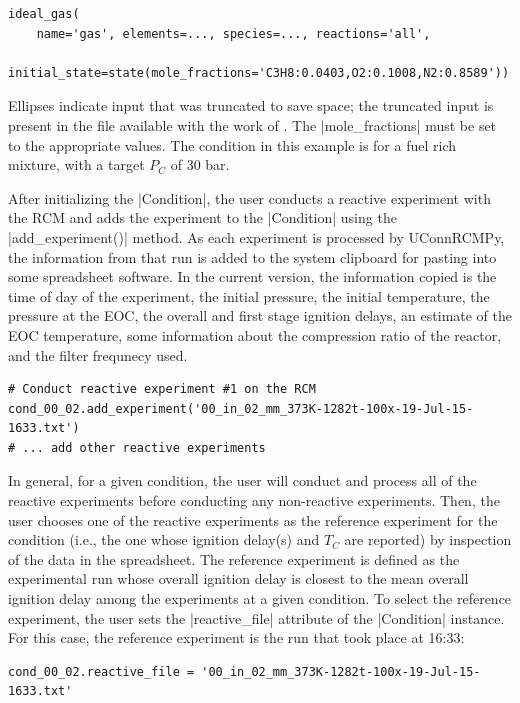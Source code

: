 \documentclass[12pt]{../ussci}
\begin{document}
\begin{verbatim}
ideal_gas(
    name='gas', elements=..., species=..., reactions='all',
    initial_state=state(mole_fractions='C3H8:0.0403,O2:0.1008,N2:0.8589'))
\end{verbatim}

Ellipses indicate input that was truncated to save space; the truncated input is
present in the file available with the work of \textcite{Dames2016}. The
\python|mole_fractions| must be set to the appropriate values. The condition in
this example is for a fuel rich mixture, with a target \(P_C\) of 30 bar.

After initializing the \python|Condition|, the user conducts a reactive
experiment with the RCM and adds the experiment to the \python|Condition| using
the \python|add_experiment()| method. As each experiment is processed by
UConnRCMPy, the information from that run is added to the system clipboard for
pasting into some spreadsheet software. In the current version, the information
copied is the time of day of the experiment, the initial pressure, the initial
temperature, the pressure at the EOC, the overall and first stage ignition
delays, an estimate of the EOC temperature, some information about the
compression ratio of the reactor, and the filter frequnecy used.

\begin{verbatim}
# Conduct reactive experiment #1 on the RCM
cond_00_02.add_experiment('00_in_02_mm_373K-1282t-100x-19-Jul-15-1633.txt')
# ... add other reactive experiments
\end{verbatim}

In general, for a given condition, the user will conduct and process all
of the reactive experiments before conducting any non-reactive
experiments. Then, the user chooses one of the reactive experiments as
the reference experiment for the condition (i.e., the one whose ignition
delay(s) and \(T_C\) are reported) by inspection of the data in the
spreadsheet. The reference experiment is defined as the experimental run
whose overall ignition delay is closest to the mean overall ignition
delay among the experiments at a given condition. To select the
reference experiment, the user sets the \python|reactive_file|
attribute of the \python|Condition| instance. For this case, the
reference experiment is the run that took place at 16:33:

\begin{verbatim}
cond_00_02.reactive_file = '00_in_02_mm_373K-1282t-100x-19-Jul-15-1633.txt'
\end{verbatim}
\end{document}
